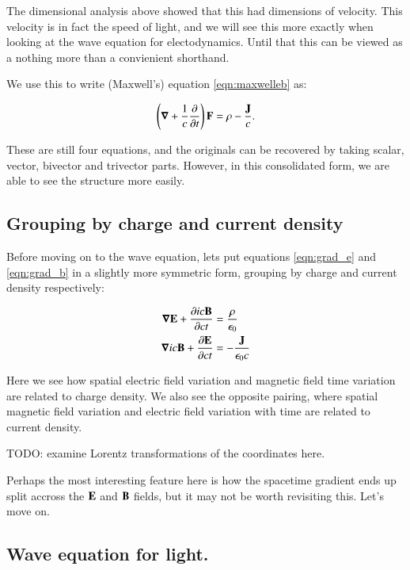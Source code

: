 \documentclass{article}      %
\newcommand{\spacegrad}[0]{\boldsymbol{\nabla}}
\begin{document}
The dimensional analysis above showed that this had dimensions of velocity.  This velocity is in fact the speed of light, and
we will see this more exactly when looking at the wave equation for electodynamics.  Until that this can be viewed as a
nothing more than a convienient shorthand.

We use this to write (Maxwell's) equation \ref{eqn:maxwelleb} as:

\begin{equation}\label{eqn:maxwellvs}
\left(\spacegrad + \inv{c}\frac{\partial}{\partial t} \right) \BF = \rho - \frac{\BJ}{c}.
\end{equation}

These are still four equations, and the originals can be recovered by taking scalar, vector, bivector and trivector parts.  However, in this
consolidated form, we are able to see the structure more easily.

\subsection{ Grouping by charge and current density }

Before moving on to the wave equation, lets put equations \ref{eqn:grad_e} and \ref{eqn:grad_b} in a slightly more symmetric form,
grouping by charge and current density respectively:

\begin{align}
\spacegrad \BE + \frac{\partial ic\BB}{\partial ct} &= \frac{\rho}{\epsilon_0} \label{eqn:gradE} \\
\spacegrad ic\BB + \frac{\partial \BE}{\partial ct} &= -\frac{\BJ}{\epsilon_0 c} \label{eqn:gradB}
\end{align}

Here we see how spatial electric field variation and magnetic field time variation are related to charge density.  We also see the
opposite pairing, where 
spatial magnetic field variation and electric field variation with time are related to current density.

TODO: examine Lorentz transformations of the coordinates here.

Perhaps the most interesting feature here is how the spacetime gradient ends up split accross the $\mathbf{E}$ and $\mathbf{B}$ fields, but 
it may not be worth revisiting this.  Let's move on.

\subsection{ Wave equation for light. }
\end{document}

